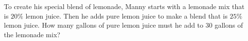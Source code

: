 To create his special blend of lemonade, Manny starts with a lemonade mix that is $20\%$ lemon juice. Then he adds pure lemon juice to make a blend that is $25\%$ lemon juice. How many gallons of pure lemon juice must he add to $30$ gallons of the lemonade mix?
